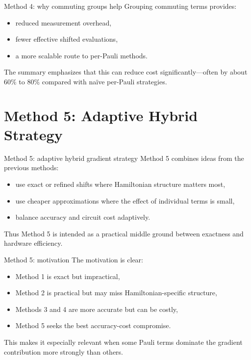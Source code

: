 \documentclass[aspectratio=169]{beamer}
\begin{document}
\begin{frame}{Method 4: why commuting groups help}
Grouping commuting terms provides:
\begin{itemize}
\item reduced measurement overhead,
\item fewer effective shifted evaluations,
\item a more scalable route to per-Pauli methods.
\end{itemize}

The summary emphasizes that this can reduce cost significantly---often by about \(60\%\) to \(80\%\) compared with na\"ive per-Pauli strategies.
\end{frame}

\section{Method 5: Adaptive Hybrid Strategy}

\begin{frame}{Method 5: adaptive hybrid gradient strategy}
Method 5 combines ideas from the previous methods:
\begin{itemize}
\item use exact or refined shifts where Hamiltonian structure matters most,
\item use cheaper approximations where the effect of individual terms is small,
\item balance accuracy and circuit cost adaptively.
\end{itemize}

Thus Method 5 is intended as a practical middle ground between exactness and hardware efficiency.
\end{frame}

\begin{frame}{Method 5: motivation}
The motivation is clear:
\begin{itemize}
\item Method 1 is exact but impractical,
\item Method 2 is practical but may miss Hamiltonian-specific structure,
\item Methods 3 and 4 are more accurate but can be costly,
\item Method 5 seeks the best accuracy-cost compromise.
\end{itemize}

This makes it especially relevant when some Pauli terms dominate the gradient contribution more strongly than others.
\end{frame}
\end{document}
